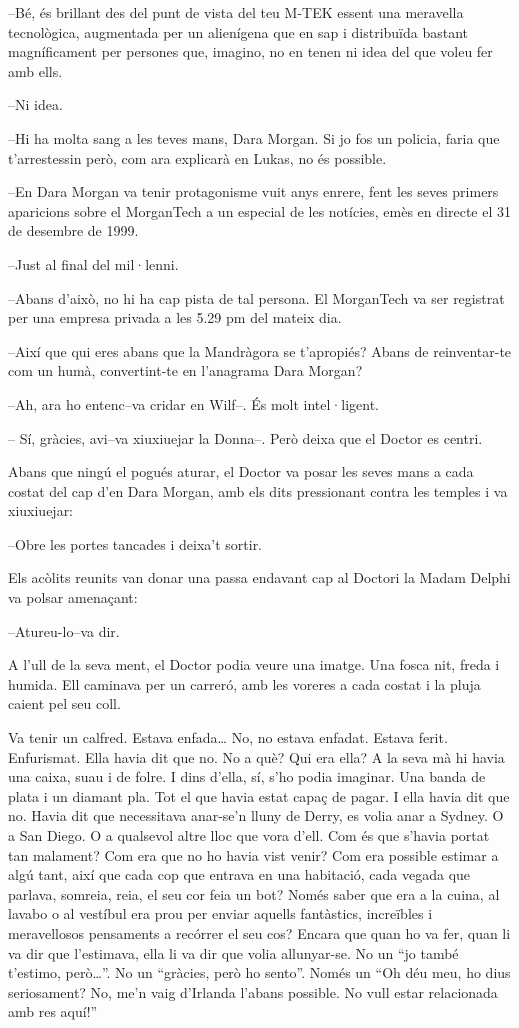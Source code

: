 --Bé, és brillant des del punt de vista del teu M-TEK essent una
meravella tecnològica, augmentada per un alienígena que en sap i
distribuïda bastant magníficament per persones que, imagino, no en tenen
ni idea del que voleu fer amb ells.

--Ni idea.

--Hi ha molta sang a les teves mans, Dara Morgan. Si jo fos un policia,
faria que t'arrestessin però, com ara explicarà en Lukas, no és
possible.

--En Dara Morgan va tenir protagonisme vuit anys enrere, fent les seves
primers aparicions sobre el MorganTech a un especial de les notícies,
emès en directe el 31 de desembre de 1999.

--Just al final del mil·lenni.

--Abans d'això, no hi ha cap pista de tal persona. El MorganTech va ser
registrat per una empresa privada a les 5.29 pm del mateix dia.

--Així que qui eres abans que la Mandràgora se t'apropiés? Abans de
reinventar-te com un humà, convertint-te en l'anagrama Dara Morgan?

--Ah, ara ho entenc--va cridar en Wilf--. És molt intel·ligent.

-- Sí, gràcies, avi--va xiuxiuejar la Donna--. Però deixa que el Doctor
es centri.

Abans que ningú el pogués aturar, el Doctor va posar les seves mans a
cada costat del cap d'en Dara Morgan, amb els dits pressionant contra
les temples i va xiuxiuejar:

--Obre les portes tancades i deixa't sortir.

Els acòlits reunits van donar una passa endavant cap al Doctori la Madam
Delphi va polsar amenaçant:

--Atureu-lo--va dir.

A l'ull de la seva ment, el Doctor podia veure una imatge. Una fosca
nit, freda i humida. Ell caminava per un carreró, amb les voreres a cada
costat i la pluja caient pel seu coll.

Va tenir un calfred. Estava enfada\ldots{} No, no estava enfadat. Estava
ferit. Enfurismat. Ella havia dit que no. No a què? Qui era ella? A la
seva mà hi havia una caixa, suau i de folre. I dins d'ella, sí, s'ho
podia imaginar. Una banda de plata i un diamant pla. Tot el que havia
estat capaç de pagar. I ella havia dit que no. Havia dit que necessitava
anar-se'n lluny de Derry, es volia anar a Sydney. O a San Diego. O a
qualsevol altre lloc que vora d'ell. Com és que s'havia portat tan
malament? Com era que no ho havia vist venir? Com era possible estimar a
algú tant, així que cada cop que entrava en una habitació, cada vegada
que parlava, somreia, reia, el seu cor feia un bot? Només saber que era
a la cuina, al lavabo o al vestíbul era prou per enviar aquells
fantàstics, increïbles i meravellosos pensaments a recórrer el seu cos?
Encara que quan ho va fer, quan li va dir que l'estimava, ella li va dir
que volia allunyar-se. No un ``jo també t'estimo, però\ldots{}''. No un
``gràcies, però ho sento''. Només un ``Oh déu meu, ho dius seriosament?
No, me'n vaig d'Irlanda l'abans possible. No vull estar relacionada amb
res aquí!''

